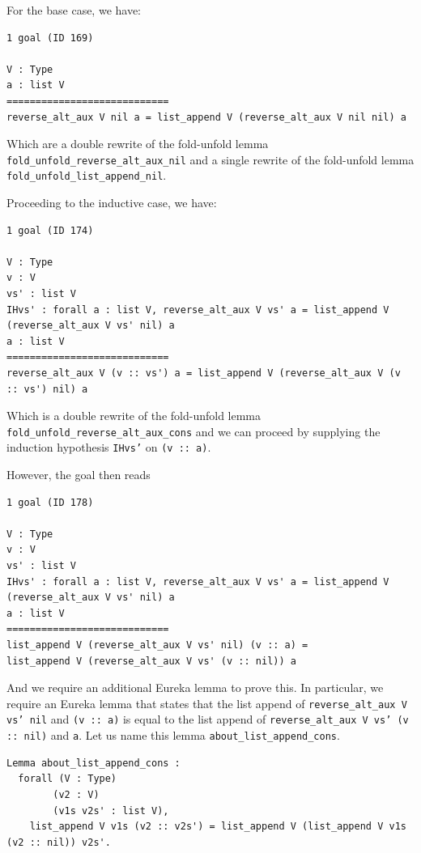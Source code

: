 \documentclass{article}
\begin{document}
For the base case, we have:

\begin{lstlisting}
1 goal (ID 169)

V : Type
a : list V
============================
reverse_alt_aux V nil a = list_append V (reverse_alt_aux V nil nil) a
\end{lstlisting}

Which are a double rewrite of the fold-unfold lemma \texttt{fold\_unfold\_reverse\_alt\_aux\_nil} and a single rewrite of the fold-unfold lemma \texttt{fold\_unfold\_list\_append\_nil}.

Proceeding to the inductive case, we have:

\begin{lstlisting}
1 goal (ID 174)

V : Type
v : V
vs' : list V
IHvs' : forall a : list V, reverse_alt_aux V vs' a = list_append V (reverse_alt_aux V vs' nil) a
a : list V
============================
reverse_alt_aux V (v :: vs') a = list_append V (reverse_alt_aux V (v :: vs') nil) a
\end{lstlisting}

Which is a double rewrite of the fold-unfold lemma \texttt{fold\_unfold\_reverse\_alt\_aux\_cons} and we can proceed by supplying the induction hypothesis \texttt{IHvs'} on \texttt{(v :: a)}.

However, the goal then reads 

\begin{lstlisting}
1 goal (ID 178)

V : Type
v : V
vs' : list V
IHvs' : forall a : list V, reverse_alt_aux V vs' a = list_append V (reverse_alt_aux V vs' nil) a
a : list V
============================
list_append V (reverse_alt_aux V vs' nil) (v :: a) =
list_append V (reverse_alt_aux V vs' (v :: nil)) a
\end{lstlisting}

And we require an additional Eureka lemma to prove this. In particular, we require an Eureka lemma that states that the list append of \texttt{reverse\_alt\_aux V vs' nil} and \texttt{(v :: a)} is equal to the list append of \texttt{reverse\_alt\_aux V vs' (v :: nil)} and \texttt{a}. Let us name this lemma \texttt{about\_list\_append\_cons}.

\begin{lstlisting}
Lemma about_list_append_cons :
  forall (V : Type)
        (v2 : V)
        (v1s v2s' : list V),
    list_append V v1s (v2 :: v2s') = list_append V (list_append V v1s (v2 :: nil)) v2s'.
\end{lstlisting}
\end{document}
